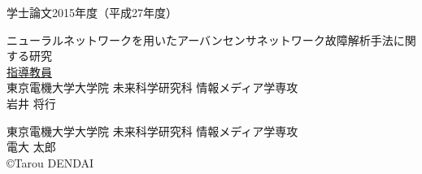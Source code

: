 \pagestyle{empty}
\begin{center}

\LARGE{学士論文\hspace{10mm}2015年度（平成27年度）}\\

\vspace{19mm}

\huge{ニューラルネットワークを用いたアーバンセンサネットワーク故障解析手法に関する研究}\\
\vspace{60mm}
\large{\underline{指導教員}}\\
\large{東京電機大学大学院 未来科学研究科 情報メディア学専攻}\\
\Large{岩井 将行}\\

\vspace{40mm}

\large{東京電機大学大学院 未来科学研究科 情報メディア学専攻}\\
\LARGE{電大 太郎}\\
\large{\copyright Tarou DENDAI}\\
\end{center}
